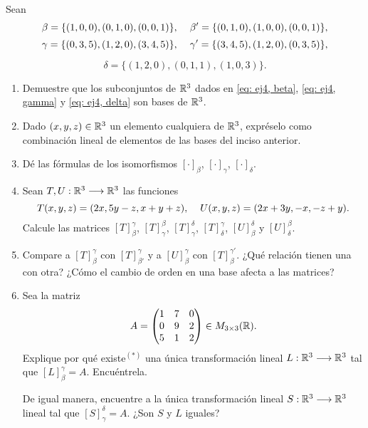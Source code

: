 Sean 
\begin{equation}
	\label{eq: ej4, beta}
	\beta = \{ (1, 0, 0), (0, 1, 0), (0, 0, 1) \}, 
	\hspace{0.4cm}
	\beta ' = \{ (0, 1, 0), (1, 0, 0), (0, 0, 1) \},
\end{equation}
\begin{equation}
	\label{eq: ej4, gamma}
	\gamma = \{ (0, 3, 5), (1, 2, 0), (3, 4, 5) \}, 
	\hspace{0.4cm}
	\gamma ' = \{ (3, 4, 5), (1, 2, 0), (0, 3, 5) \},
\end{equation}

\begin{equation}
\label{eq: ej4, delta}
	\delta = \{ (1, 2, 0), (0, 1, 1), (1, 0, 3) \}.
\end{equation}

\begin{enumerate}
	\item Demuestre que los subconjuntos de $\mathbb{R}^{3}$ dados en 
	\eqref{eq: ej4, beta}, \eqref{eq: ej4, gamma} y 
	\eqref{eq: ej4, delta} son bases de $\mathbb{R}^{3}$.
	
	\item Dado $(x, y, z) \in \mathbb{R}^{3}$ un elemento cualquiera de 
	$\mathbb{R}^{3}$, expréselo como combinación lineal de elementos
	de las bases del inciso anterior.
	
	\item Dé las fórmulas de los isomorfismos 
	$[ \cdot ]_{\beta}$, $[ \cdot ]_{\gamma}$, 
	$[ \cdot ]_{\delta}$.
	
	\item Sean $T, U : \mathbb{R}^{3} \longrightarrow \mathbb{R}^{3}$ las funciones
	\[
	T(x, y, z) = (2x, 5y-z, x+y+z), \hspace{0.4cm}
	U(x, y, z) = (2x+3y, -x, -z+y).
	\]
	Calcule las matrices 
	$[T]_{\beta}^{\gamma}$, $[T]_{\gamma}^{\beta}$, 
	$[T]_{\gamma}^{\delta}$, $[T]_{\delta}^{\gamma}$,
	$[U]_{\beta}^{\delta}$ y $[U]_{\delta}^{\beta}$.
	
	\item Compare a $[T]_{\beta}^{\gamma}$ con $[T]_{\beta '}^{\gamma}$
	y a 
	$[U]_{\beta}^{\gamma}$ con $[T]_{\beta}^{\gamma '}$. ¿Qué relación
	tienen una con otra? ¿Cómo el cambio de orden en una base afecta
	a las matrices?
	
	\item Sea la matriz
	\[
	A = 
	\begin{pmatrix}
	1 & 7 & 0 \\
	0 & 9 & 2 \\
	5 & 1 & 2
	\end{pmatrix} \in M_{3 \times 3} (\mathbb{R}).
	\]
	Explique por qué existe$^{(*)}$ 
	una única transformación lineal
	$L: \mathbb{R}^{3} \longrightarrow \mathbb{R}^{3}$ tal que 
	$[L]_{\beta}^{\gamma} = A$. Encuéntrela.
	
	De igual manera, encuentre a la única transformación lineal
	$S: \mathbb{R}^{3} \longrightarrow \mathbb{R}^{3}$ lineal tal que 
	$[S]_{\gamma}^{\delta} = A$. ¿Son $S$ y $L$ iguales?	
\end{enumerate}

